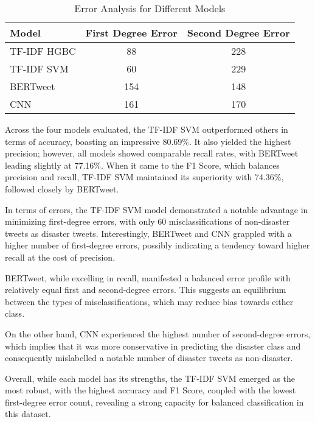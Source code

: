 \documentclass[10pt,table]{article}
\begin{document}
\begin{table}[h]
    \centering
    \begin{tabular}{lcc}
    \hline
    \textbf{Model}      & \textbf{First Degree Error} & \textbf{Second Degree Error} \\ \hline
    TF-IDF HGBC    & 88                          & 228                         \\
    TF-IDF SVM     & 60                          & 229                         \\
    BERTweet       & 154                         & 148                         \\
    CNN            & 161                         & 170                         \\ \hline
    \end{tabular}
    \caption{Error Analysis for Different Models}
\end{table}

Across the four models evaluated, the TF-IDF SVM outperformed others in terms of accuracy, boasting an impressive 80.69\%. It also yielded the highest precision; however, all models showed comparable recall rates, with BERTweet leading slightly at 77.16\%. When it came to the F1 Score, which balances precision and recall, TF-IDF SVM maintained its superiority with 74.36\%, followed closely by BERTweet.

In terms of errors, the TF-IDF SVM model demonstrated a notable advantage in minimizing first-degree errors, with only 60 misclassifications of non-disaster tweets as disaster tweets. Interestingly, BERTweet and CNN grappled with a higher number of first-degree errors, possibly indicating a tendency toward higher recall at the cost of precision.

BERTweet, while excelling in recall, manifested a balanced error profile with relatively equal first and second-degree errors. This suggests an equilibrium between the types of misclassifications, which may reduce bias towards either class.

On the other hand, CNN experienced the highest number of second-degree errors, which implies that it was more conservative in predicting the disaster class and consequently mislabelled a notable number of disaster tweets as non-disaster.

Overall, while each model has its strengths, the TF-IDF SVM emerged as the most robust, with the highest accuracy and F1 Score, coupled with the lowest first-degree error count, revealing a strong capacity for balanced classification in this dataset.
\end{document}

